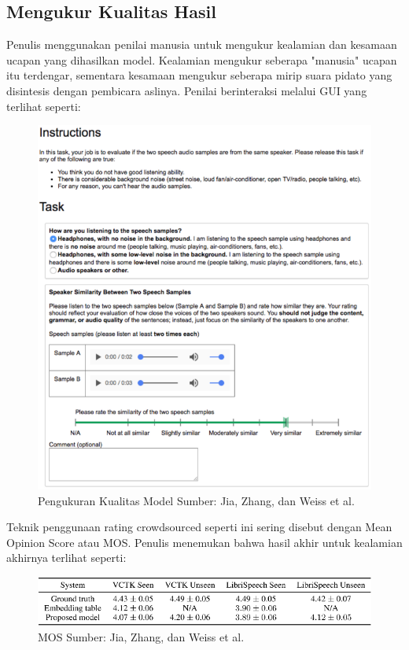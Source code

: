 \subsection{Mengukur Kualitas Hasil}
Penulis menggunakan penilai manusia untuk mengukur kealamian dan kesamaan ucapan yang dihasilkan model.
Kealamian mengukur seberapa "manusia" ucapan itu terdengar, sementara kesamaan mengukur seberapa mirip suara pidato yang disintesis dengan pembicara aslinya.
Penilai berinteraksi melalui GUI yang terlihat seperti:
\begin{figure}[H]
        \centerline{\includegraphics[scale=.45]{figures/nilai}}
        \caption{Pengukuran Kualitas Model Sumber: Jia, Zhang, dan Weiss et al.}
		\label{nilai}
\end{figure}
Teknik penggunaan rating crowdsourced seperti ini sering disebut dengan Mean Opinion Score atau MOS.
Penulis menemukan bahwa hasil akhir untuk kealamian akhirnya terlihat seperti:
\begin{figure}[H]
        \centerline{\includegraphics[scale=.45]{figures/hasil}}
        \caption{MOS Sumber: Jia, Zhang, dan Weiss et al.}
		\label{mos}
\end{figure}

